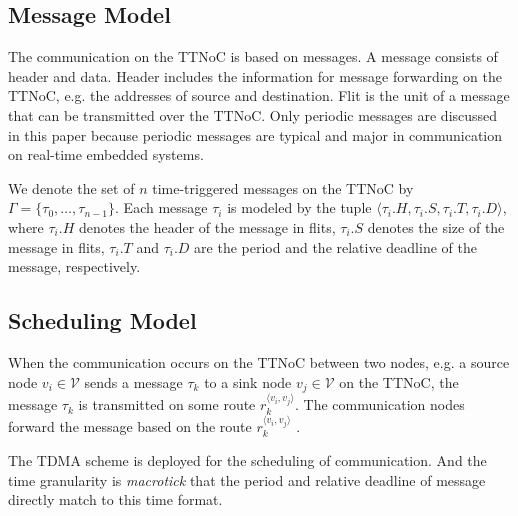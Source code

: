 \documentclass[journal]{IEEEtran}
\newcommand{\calV}{\mathcal{V}}
\newcommand{\route}[3]{#1^{\langle #2,#3\rangle}}
\theoremstyle{remark}
\begin{document}


\subsection{Message Model}

The communication on the TTNoC is based on messages.  
A message consists of header and data.  
Header includes the information for message forwarding on the TTNoC,
 e.g. the addresses of source and destination. 
Flit is the unit of a message that can be transmitted over the TTNoC.  
Only periodic messages are discussed in this paper because periodic messages are typical and major in communication on real-time embedded systems.

We denote the set of $n$ time-triggered messages on the TTNoC by $\Gamma = \{\tau_{0},\dots,\tau_{n-1}\}$. 
Each message $\tau_{i}$ is modeled by the tuple $\langle \tau_{i}.H,\tau_{i}.S, \tau_{i}.T,\tau_{i}.D\rangle$, 
 where $\tau_{i}.H$ denotes the header of the message in flits,
 $\tau_{i}.S$ denotes the size of the message in flits, 
 $\tau_{i}.T$ and $\tau_{i}.D$ are the period and the relative deadline of the message, respectively.
 
\subsection{Scheduling Model}
\label{ss:schmodel}

When the communication occurs on the TTNoC between two nodes,
 e.g. a source node $v_i\in \calV$ sends a message $\tau_{k}$ to a sink node $v_j\in \calV$ on the TTNoC,
  the message $\tau_k$ is transmitted on some route $\route{r_k}{v_i}{v_j}$. 
The communication nodes forward the message based on the route $\route{r_k}{v_i}{v_j}$ .

The TDMA scheme is deployed for the scheduling of communication.  
And the time granularity is \emph{macrotick} that the period and relative deadline of message directly match to this time format.
\end{document}
